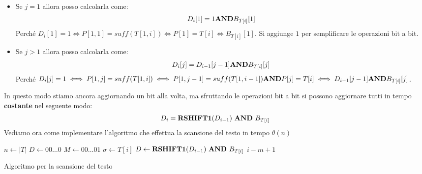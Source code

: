 \begin{itemize}
    \item Se $j =  1$ allora posso calcolarla come:
    \begin{equation}
        D_i[1] = 1 \text{\textbf{AND}} B_{T[i]}[1]
    \end{equation}
    Perché $D_i[1] = 1\iff P[1,1] =suff(T[1,i])\iff P[1] = T[i]\iff B_{T[i]}[1]$.
    Si aggiunge $1$ per semplificare le operazioni bit a bit. 
    \item Se $j > 1$ allora posso calcolarla come:
    \begin{equation}
        D_i[j] = D_{i - 1}[j - 1] \text{\textbf{AND}} B_{T[i]}[j]
    \end{equation}
    Perché $D_i[j] = 1 \iff P[1,j] = suff(T[1,i]) \iff P[1,j-1] = suff(T[1,i-1]) \text{\textbf{AND}} P[j] = T[i] \iff D_{i-1}[j-1] \text{\textbf{AND}} B_{T[i]}[j]$.
\end{itemize}
In questo modo stiamo ancora aggiornando un bit alla volta, ma sfruttando le operazioni bit a bit si possono aggiornare tutti in tempo \textbf{costante} nel seguente modo:
\begin{equation}
    D_i = \text{\textbf{RSHIFT1}}(D_{i - 1}) \ \text{\textbf{AND}} \ B_{T[i]}
\end{equation}
Vediamo ora come implementare l'algoritmo che effettua la scansione del testo in tempo $\theta(n)$
\begin{algorithm}
  \begin{algorithmic}
        \State $n \gets |T|$
        \State $D \gets 00\dots0$
        \State $M \gets 00\dots01$
            \State $\sigma \gets T[i]$
            \State $D \gets \text{\textbf{RSHIFT1}}(D_{i - 1}) \ \text{\textbf{AND}} \ B_{T[i]}$
                \State {} $i - m + 1$
            \EndIf
        \EndFor
    \EndFunction
  \end{algorithmic}
  \caption{Algoritmo per la scansione del testo}
\end{algorithm}

